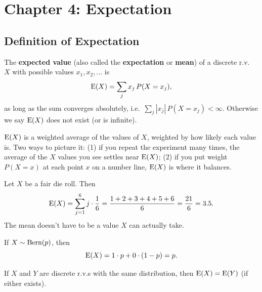 \section[Expectation]{Chapter 4: Expectation}

\subsection{Definition of Expectation}

\bigskip

\begin{definition}\label{def:expectation}
The \textbf{expected value} (also called the \textbf{expectation} or \textbf{mean}) of a discrete r.v.\ $X$ with possible values $x_1, x_2, \dots$ is
\medskip
\[
\operatorname{E}(X) = \sum_{j} x_j\, P(X = x_j),
\]
\medskip
as long as the sum converges absolutely, i.e.\ $\sum_j |x_j|\, P(X = x_j) < \infty$. Otherwise we say $\operatorname{E}(X)$ does not exist (or is infinite).
\end{definition}

\bigskip

\begin{intuition}
$\operatorname{E}(X)$ is a weighted average of the values of $X$, weighted by how likely each value is. Two ways to picture it: (1) if you repeat the experiment many times, the average of the $X$ values you see settles near $\operatorname{E}(X)$; (2) if you put weight $P(X = x)$ at each point $x$ on a number line, $\operatorname{E}(X)$ is where it balances.
\end{intuition}

\bigskip

\begin{example}\label{ex:dieE}
Let $X$ be a fair die roll. Then
\medskip
\[
\operatorname{E}(X) = \sum_{j=1}^{6} j \cdot \frac{1}{6} = \frac{1 + 2 + 3 + 4 + 5 + 6}{6} = \frac{21}{6} = 3.5.
\]
\medskip
The mean doesn't have to be a value $X$ can actually take.
\end{example}

\bigskip

\begin{example}\label{ex:bernE}
If $X \sim \operatorname{Bern}(p)$, then
\medskip
\[
\operatorname{E}(X) = 1 \cdot p + 0 \cdot (1 - p) = p.
\]
\end{example}

\bigskip

\begin{proposition}\label{prop:Edist}
If $X$ and $Y$ are discrete r.v.s with the same distribution, then $\operatorname{E}(X) = \operatorname{E}(Y)$ (if either exists).
\end{proposition}

